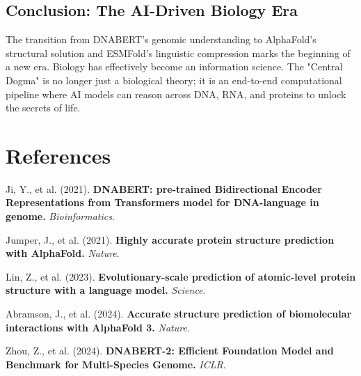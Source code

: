 ﻿\documentclass[12pt,a4paper]{article}
\begin{document}
\subsection{Conclusion: The AI-Driven Biology Era}
The transition from DNABERT's genomic understanding to AlphaFold's structural solution and ESMFold's linguistic compression marks the beginning of a new era. Biology has effectively become an information science. The "Central Dogma" is no longer just a biological theory; it is an end-to-end computational pipeline where AI models can reason across DNA, RNA, and proteins to unlock the secrets of life.

\newpage
\section*{References}

\begin{enumerate}[leftmargin=*, label={[\arabic*]}, itemsep=8pt]
  \item Ji, Y., et al. (2021). \textbf{DNABERT: pre-trained Bidirectional Encoder Representations from Transformers model for DNA-language in genome.} \textit{Bioinformatics}.
  \item Jumper, J., et al. (2021). \textbf{Highly accurate protein structure prediction with AlphaFold.} \textit{Nature}.
  \item Lin, Z., et al. (2023). \textbf{Evolutionary-scale prediction of atomic-level protein structure with a language model.} \textit{Science}.
  \item Abramson, J., et al. (2024). \textbf{Accurate structure prediction of biomolecular interactions with AlphaFold 3.} \textit{Nature}.
  \item Zhou, Z., et al. (2024). \textbf{DNABERT-2: Efficient Foundation Model and Benchmark for Multi-Species Genome.} \textit{ICLR}.
\end{enumerate}
\end{document}
